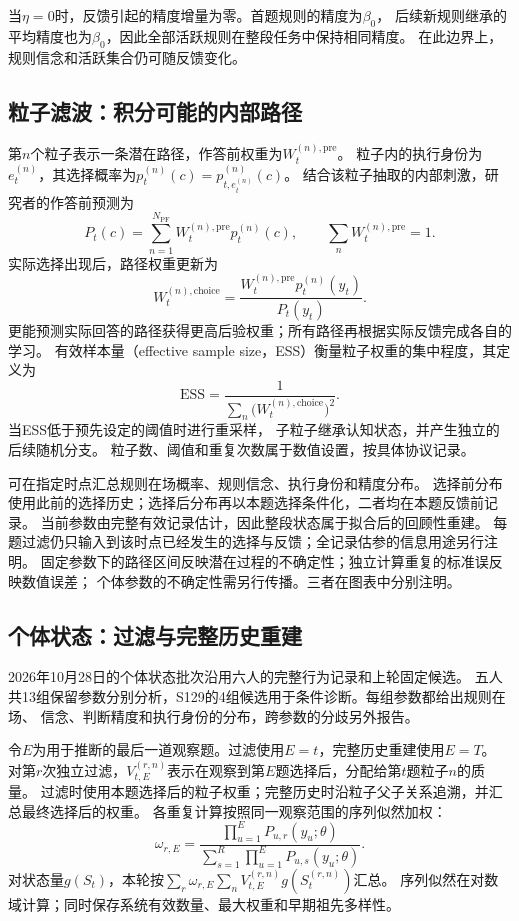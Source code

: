 \documentclass[11pt,a4paper]{article}
\numberwithin{equation}{section}
\begin{document}
当$\eta=0$时，反馈引起的精度增量为零。首题规则的精度为$\beta_0$，
后续新规则继承的平均精度也为$\beta_0$，因此全部活跃规则在整段任务中保持相同精度。
在此边界上，规则信念和活跃集合仍可随反馈变化。

\subsection{粒子滤波：积分可能的内部路径}
第$n$个粒子表示一条潜在路径，作答前权重为$W_t^{(n),\mathrm{pre}}$。
粒子内的执行身份为$e_t^{(n)}$，其选择概率为$p_t^{(n)}(c)=p_{t,e_t^{(n)}}^{(n)}(c)$。
结合该粒子抽取的内部刺激，研究者的作答前预测为
\begin{equation}
P_t(c)=\sum_{n=1}^{N_{\mathrm{PF}}}W_t^{(n),\mathrm{pre}}p_t^{(n)}(c),\qquad
\sum_nW_t^{(n),\mathrm{pre}}=1.
\label{eq:pf-predict}
\end{equation}
实际选择出现后，路径权重更新为
\begin{equation}
W_t^{(n),\mathrm{choice}}=
\frac{W_t^{(n),\mathrm{pre}}p_t^{(n)}(y_t)}{P_t(y_t)}.
\label{eq:pf-update}
\end{equation}
更能预测实际回答的路径获得更高后验权重；所有路径再根据实际反馈完成各自的学习。
有效样本量（effective sample size，ESS）衡量粒子权重的集中程度，其定义为
\begin{equation}
\mathrm{ESS}=\frac{1}{\sum_n\bigl(W_t^{(n),\mathrm{choice}}\bigr)^2}.
\end{equation}
当ESS低于预先设定的阈值时进行重采样，
子粒子继承认知状态，并产生独立的后续随机分支。
粒子数、阈值和重复次数属于数值设置，按具体协议记录。

可在指定时点汇总规则在场概率、规则信念、执行身份和精度分布。
选择前分布使用此前的选择历史；选择后分布再以本题选择条件化，二者均在本题反馈前记录。
当前参数由完整有效记录估计，因此整段状态属于拟合后的回顾性重建。
每题过滤仍只输入到该时点已经发生的选择与反馈；全记录估参的信息用途另行注明。
固定参数下的路径区间反映潜在过程的不确定性；独立计算重复的标准误反映数值误差；
个体参数的不确定性需另行传播。三者在图表中分别注明。

\subsection{个体状态：过滤与完整历史重建}
\label{sec:individual-states}
2026年10月28日的个体状态批次沿用六人的完整行为记录和上轮固定候选。
五人共13组保留参数分别分析，S129的4组候选用于条件诊断。每组参数都给出规则在场、
信念、判断精度和执行身份的分布，跨参数的分歧另外报告。

令$E$为用于推断的最后一道观察题。过滤使用$E=t$，完整历史重建使用$E=T$。
对第$r$次独立过滤，$V_{t,E}^{(r,n)}$表示在观察到第$E$题选择后，分配给第$t$题粒子$n$的质量。
过滤时使用本题选择后的粒子权重；完整历史时沿粒子父子关系追溯，并汇总最终选择后的权重。
各重复计算按照同一观察范围的序列似然加权：
\begin{equation}
\omega_{r,E}=\frac{\prod_{u=1}^{E}P_{u,r}(y_u;\theta)}
{\sum_{s=1}^{R}\prod_{u=1}^{E}P_{u,s}(y_u;\theta)}.
\end{equation}
对状态量$g(S_t)$，本轮按$\sum_r\omega_{r,E}\sum_nV_{t,E}^{(r,n)}g(S_t^{(r,n)})$汇总。
序列似然在对数域计算；同时保存系统有效数量、最大权重和早期祖先多样性。
\end{document}
